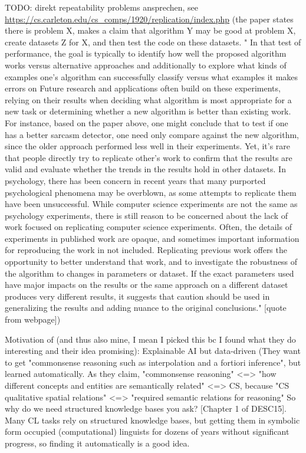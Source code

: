 TODO: direkt repeatability problems ansprechen, see \url{https://cs.carleton.edu/cs_comps/1920/replication/index.php} (the paper states there is problem X, makes a claim that algorithm Y may be good at problem X, create datasets Z for X, and then test the code on these datasets. " In that test of performance, the goal is typically to identify how well the proposed algorithm works versus alternative approaches and additionally to explore what kinds of examples one's algorithm can successfully classify versus what examples it makes errors on  Future research and applications often build on these experiments, relying on their results when deciding what algorithm is most appropriate for a new task or determining whether a new algorithm is better than existing work. For instance, based on the paper above, one might conclude that to test if one has a better sarcasm detector, one need only compare against the new algorithm, since the older approach performed less well in their experiments. Yet, it's rare that people directly try to replicate other's work to confirm that the results are valid and evaluate whether the trends in the results hold in other datasets. In psychology, there has been concern in recent years that many purported psychological phenomena may be overblown, as some attempts to replicate them have been unsuccessful. While computer science experiments are not the same as psychology experiments, there is still reason to be concerned about the lack of work focused on replicating computer science experiments. Often, the details of experiments in published work are opaque, and sometimes important information for reproducing the work in not included. Replicating previous work offers the opportunity to better understand that work, and to investigate the robustness of the algorithm to changes in parameters or dataset. If the exact parameters used have major impacts on the results or the same approach on a different dataset produces very different results, it suggests that caution should be used in generalizing the results and adding nuance to the original conclusions." [quote from webpage])


Motivation of \textcite{Derrac2015} (and thus also mine, I mean I picked this bc I found what they do interesting and their idea promising): Explainable AI but data-driven (They want to get "commonsense reasoning such as interpolation and a fortiori inference", but learned automatically. As they claim, "commonsense reasoning" <=> "how different concepts and entities are semantically related" <=> CS, because "CS qualitative spatial relations" <=> "required semantic relations for reasoning"
So why do we need structured knowledge bases you ask? [Chapter 1 of DESC15]. Many CL tasks rely on structured  knowledge bases, but getting them in symbolic form occupied (computational) linguists for dozens of years without significant progress, so finding it automatically is a good idea.

